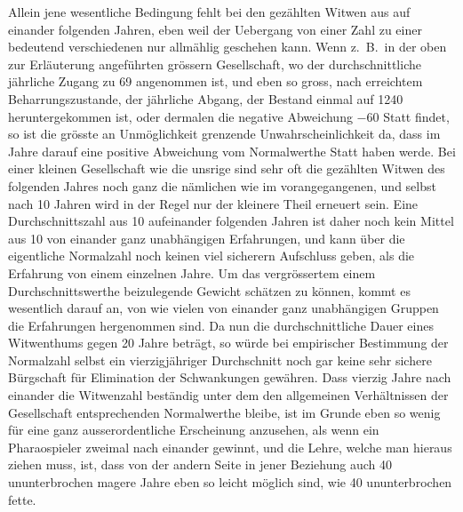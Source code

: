 \documentclass[12pt,a4paper]{article}
\begin{document}
Allein jene wesentliche Bedingung fehlt bei den gez\"ahlten Witwen aus auf einander folgenden Jahren, eben weil der Uebergang von einer Zahl zu einer bedeutend verschiedenen nur allm\"ahlig geschehen kann. Wenn z.\ B.\ in der oben zur Erl\"auterung angef\"uhrten gr\"ossern Gesellschaft, wo der durchschnittliche j\"ahrliche Zugang zu 69 angenommen ist, und eben so gross, nach erreichtem Beharrungszustande, der j\"ahrliche Abgang, der Bestand einmal auf 1240 heruntergekommen ist, oder dermalen die negative Abweichung $-60$ Statt findet, so ist die gr\"osste an Unm\"oglichkeit grenzende Unwahrscheinlichkeit da, dass im Jahre darauf eine positive Abweichung vom Normalwerthe Statt haben werde. Bei einer kleinen Gesellschaft wie die unsrige sind sehr oft die gez\"ahlten Witwen des folgenden Jahres noch ganz die n\"amlichen wie im vorangegangenen, und selbst nach 10 Jahren wird in der Regel nur der kleinere Theil erneuert sein. Eine Durchschnittszahl aus 10 aufeinander folgenden Jahren ist daher noch kein Mittel aus 10 von einander ganz unabh\"angigen Erfahrungen, und kann \"uber die eigentliche Normalzahl noch keinen viel sicherern Aufschluss geben, als die Erfahrung von einem einzelnen Jahre. Um das vergr\"ossertem einem Durchschnittswerthe beizulegende Gewicht sch\"atzen zu k\"onnen, kommt es wesentlich darauf an, von wie vielen von einander ganz unabh\"angigen Gruppen die Erfahrungen hergenommen sind. Da nun die durchschnittliche Dauer eines Witwenthums gegen 20 Jahre betr\"agt, so w\"urde bei empirischer Bestimmung der Normalzahl selbst ein vierzigj\"ahriger Durchschnitt noch gar keine sehr sichere B\"urgschaft f\"ur Elimination der Schwankungen gew\"ahren. Dass vierzig Jahre nach einander die Witwenzahl best\"andig unter dem den allgemeinen Verh\"altnissen der Gesellschaft entsprechenden Normalwerthe bleibe, ist im Grunde eben so wenig f\"ur eine ganz ausserordentliche Erscheinung anzusehen, als wenn ein Pharaospieler zweimal nach einander gewinnt, und die Lehre, welche man hieraus ziehen muss, ist, dass von der andern Seite in jener Beziehung auch 40 ununterbrochen magere Jahre eben so leicht m\"oglich sind, wie 40 ununterbrochen fette.
\end{document}
